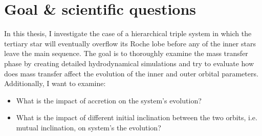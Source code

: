\section{Goal \& scientific questions}\label{sec:goal}

In this thesis, I investigate the case of a hierarchical triple system in which the tertiary star will eventually overflow its Roche lobe before any of the inner stars leave the main sequence. The goal is to thoroughly examine the mass transfer phase by creating detailed hydrodynamical simulations and try to evaluate how does mass transfer affect the evolution of the inner and outer orbital parameters. Additionally, I want to examine:
\begin{itemize}
    \item What is the impact of accretion on the system's evolution?
    \item What is the impact of different initial inclination between the two orbits, i.e. mutual inclination, on system's the evolution?
\end{itemize}





